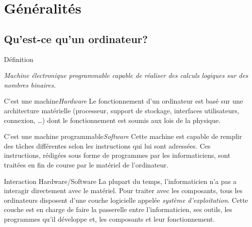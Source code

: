 \section{Généralités}
\subsection{Qu'est-ce qu'un ordinateur?}
\begin{frame}{Définition}
  \begin{definition}[Ordinateur]\it
    Machine électronique programmable capable de réaliser des calculs
    logiques sur des nombres binaires.
  \end{definition}
  \begin{block}{C'est une machine\hfill\emph{Hardware}}
    Le fonctionnement d'un ordinateur est basé sur une architecture
    matérielle (processeur, support de stockage, interfaces
    utilisateurs, connexion, \dots) dont le fonctionnement est soumis
    aux lois de la physique.
  \end{block}
  \begin{block}{C'est une machine programmable\hfill\emph{Software}}
    Cette machine est capable de remplir des tâches différentes selon
    les instructions qui lui sont adressées. Ces instructions, rédigées
    sous forme de programmes par les informaticiens, sont traitées en
    fin de course par le matériel de l'ordinateur.
  \end{block}
  \begin{alertblock}{Interaction Hardware/Software}
    La plupart du temps, l'informaticien n'a pas a interagir directement
    avec le matériel. Pour traiter avec les composants, tous les
    ordinateurs disposent d'une couche logicielle appelée
    \emph{système d'exploitation}. Cette couche est en charge de faire la
    passerelle entre l'informaticien, ses outils, les programmes qu'il
    développe et, les composants et leur fonctionnement.
  \end{alertblock}
\end{frame}

